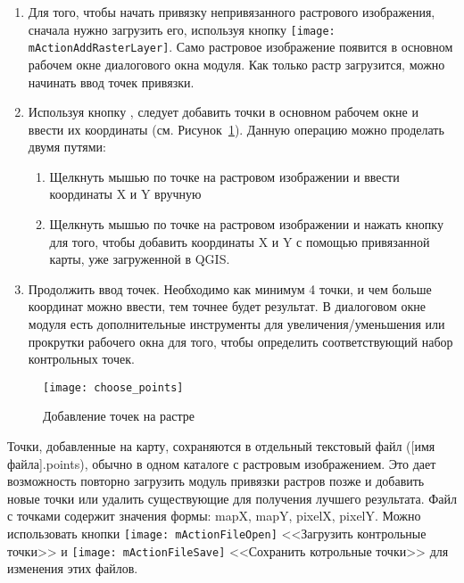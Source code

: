 \begin{enumerate}
\item Для того, чтобы начать привязку непривязанного растрового
изображения, сначала нужно загрузить его, используя кнопку
\texttt{[image: mActionAddRasterLayer]}. Само растровое
изображение появится в основном рабочем окне диалогового окна модуля.
Как только растр загрузится, можно начинать ввод точек привязки.
\item Используя кнопку ,
следует добавить точки в основном рабочем окне и ввести их координаты
(см. Рисунок~\ref{fig:choose_points}). Данную операцию можно проделать
двумя путями:

\begin{enumerate}
\item Щелкнуть мышью по точке на растровом изображении и ввести
координаты X и Y вручную
\item Щелкнуть мышью по точке на растровом изображении и нажать кнопку
 для того, чтобы добавить координаты X и Y
с помощью привязанной карты, уже загруженной в QGIS.
\end{enumerate}
\item Продолжить ввод точек. Необходимо как минимум 4 точки, и чем
больше координат можно ввести, тем точнее будет результат. В диалоговом
окне модуля есть дополнительные инструменты для увеличения/уменьшения
или прокрутки рабочего окна для того, чтобы определить соответствующий
набор контрольных точек.
\end{enumerate}

\begin{figure}[ht]
\centering
  \texttt{[image: choose\_points]}
  \caption{Добавление точек на растре \wincaption}\label{fig:choose_points}
\end{figure}

Точки, добавленные на карту, сохраняются в отдельный текстовый файл
([имя файла].points), обычно в одном каталоге с растровым изображением.
Это дает возможность повторно загрузить модуль привязки растров позже и
добавить новые точки или удалить существующие для получения лучшего
результата. Файл с точками содержит значения формы: mapX, mapY, pixelX,
pixelY. Можно использовать кнопки
\texttt{[image: mActionFileOpen]} <<Загрузить контрольные точки>> и
\texttt{[image: mActionFileSave]} <<Сохранить котрольные точки>>
для изменения этих файлов.

\label{georeferencer_transformation}

